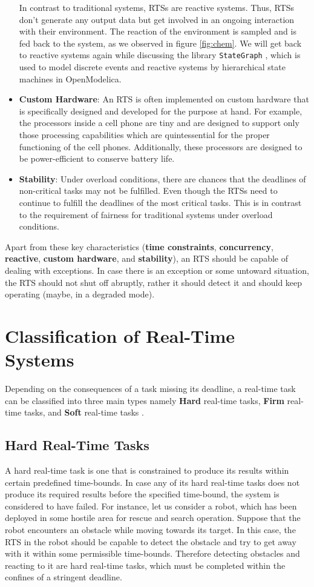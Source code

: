 \documentclass[12pt]{report}
\begin{document}
\begin{itemize}
    In contrast to traditional systems, RTSs are reactive systems. Thus, RTSs don't generate any output data but get involved in an ongoing interaction with their environment. The reaction of the environment is sampled and is fed back to the system, as we observed in figure \ref{fig:chem}. We will get back to reactive systems again while discussing the library \texttt{StateGraph} \cite{stategraph}, which is used to model discrete events and reactive systems by hierarchical state machines in OpenModelica.
 
    \item \textbf{Custom Hardware}: An RTS is often implemented on custom hardware that is specifically designed and developed for the purpose at hand. For example, the processors inside a cell phone are tiny and are designed to support only those processing capabilities which are quintessential for the proper functioning of the cell phones. Additionally, these processors are designed to be power-efficient to conserve battery life. 
    \item \textbf{Stability}: Under overload conditions, there are chances that the deadlines of non-critical tasks may not be fulfilled. Even though the RTSs need to continue to fulfill the deadlines of the most critical tasks. This is in contrast to the requirement of fairness for traditional systems under overload conditions. 
\end{itemize}
Apart from these key characteristics (\textbf{time constraints}, \textbf{concurrency}, \textbf{reactive}, \textbf{custom hardware}, and \textbf{stability}), an RTS should be capable of dealing with exceptions. In case there is an exception or some untoward situation, the RTS should not shut off abruptly, rather it should detect it and should keep operating (maybe, in a degraded mode).  

\section{Classification of Real-Time Systems}
Depending on the consequences of a task missing its deadline, a real-time task can be classified into three main types namely \textbf{Hard} real-time tasks, \textbf{Firm} real-time tasks, and \textbf{Soft} real-time tasks \cite{NPTEL}. 

\subsection{Hard Real-Time Tasks}
A hard real-time task is one that is constrained to produce its results within certain predefined time-bounds. In case any of its hard real-time tasks does not produce its required results before the specified time-bound, the system is considered to have failed. For instance, let us consider a robot, which has been deployed in some hostile area for rescue and search operation. Suppose that the robot encounters an obstacle while moving towards its target. In this case, the RTS in the robot should be capable to detect the obstacle and try to get away with it within some permissible time-bounds. Therefore detecting obstacles and reacting to it are hard real-time tasks, which must be completed within the confines of a stringent deadline. 
\end{document}
